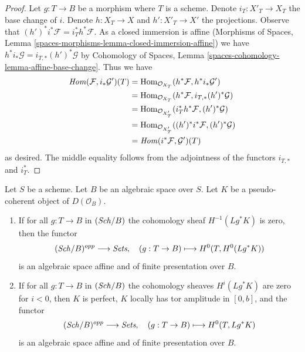\begin{proof}
Let $g : T \to B$ be a morphism where $T$ is a scheme.
Denote $i_T : X'_T \to X_T$ the base change of $i$.
Denote $h : X_T \to X$ and $h' : X'_T \to X'$ the projections.
Observe that $(h')^*i^*\mathcal{F} = i_T^*h^*\mathcal{F}$.
As a closed immersion is affine
(Morphisms of Spaces, Lemma
\ref{spaces-morphisms-lemma-closed-immersion-affine})
we have $h^*i_*\mathcal{G} = i_{T, *}(h')^*\mathcal{G}$ by
Cohomology of Spaces, Lemma \ref{spaces-cohomology-lemma-affine-base-change}.
Thus we have
\begin{align*}
\mathit{Hom}(\mathcal{F}, i_*\mathcal{G}')(T)
& =
\mathop{\mathrm{Hom}}\nolimits_{\mathcal{O}_{X_T}}(h^*\mathcal{F}, h^*i_*\mathcal{G}') \\
& =
\mathop{\mathrm{Hom}}\nolimits_{\mathcal{O}_{X_T}}(h^*\mathcal{F}, i_{T, *}(h')^*\mathcal{G}) \\
& =
\mathop{\mathrm{Hom}}\nolimits_{\mathcal{O}_{X'_T}}(i_T^*h^*\mathcal{F}, (h')^*\mathcal{G}) \\
& =
\mathop{\mathrm{Hom}}\nolimits_{\mathcal{O}_{X'_T}}((h')^*i^*\mathcal{F}, (h')^*\mathcal{G}) \\
& =
\mathit{Hom}(i^*\mathcal{F}, \mathcal{G}')(T)
\end{align*}
as desired. The middle equality follows from the adjointness of the functors
$i_{T, *}$ and $i_T^*$.
\end{proof}

\begin{lemma}
\label{lemma-cohomology-perfect-complex}
Let $S$ be a scheme. Let $B$ be an algebraic space over $S$.
Let $K$ be a pseudo-coherent object of $D(\mathcal{O}_B)$.
\begin{enumerate}
\item If for all $g : T \to B$ in $(\mathit{Sch}/B)$ the cohomology sheaf
$H^{-1}(Lg^*K)$ is zero, then the functor
$$
(\mathit{Sch}/B)^{opp} \longrightarrow \textit{Sets},\quad
(g : T \to B) \longmapsto H^0(T, H^0(Lg^*K))
$$
is an algebraic space affine and of finite presentation over $B$.
\item If for all $g : T \to B$ in $(\mathit{Sch}/B)$ the cohomology sheaves
$H^i(Lg^*K)$ are zero for $i < 0$, then $K$ is perfect,
$K$ locally has tor amplitude in $[0, b]$, and the functor
$$
(\mathit{Sch}/B)^{opp} \longrightarrow \textit{Sets},\quad
(g : T \to B) \longmapsto H^0(T, Lg^*K)
$$
is an algebraic space affine and of finite presentation over $B$.
\end{enumerate}
\end{lemma}

